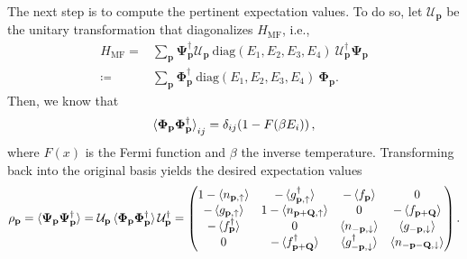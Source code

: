 \documentclass{article}
\begin{document}
The next step is to compute the pertinent expectation values.
To do so, let $\mathcal{U}_{\mathbf{p}}$ be the unitary transformation that diagonalizes $H_\mathrm{MF}$, i.e.,
\begin{align}
  H_\mathrm{MF} = &\sum_{\mathbf{p}} \mathbf{\Psi}_{\mathbf{p}}^\dagger \mathcal{U}_{\mathbf{p}} \ \mathrm{diag}(E_1, E_2, E_3, E_4)\ \mathcal{U}_{\mathbf{p}}^\dagger \mathbf{\Psi}_{\mathbf{p}} \\
    \coloneqq &\sum_{\mathbf{p}} \mathbf{\Phi}_{\mathbf{p}}^\dagger \ \mathrm{diag}(E_1, E_2, E_3, E_4)\ \mathbf{\Phi}_{\mathbf{p}}.
\end{align}
Then, we know that
\begin{equation}
    \braket{\mathbf{\Phi}_{\mathbf{p}} \mathbf{\Phi}_{\mathbf{p}}^\dagger}_{ij} = \delta_{ij} (1 - F(\beta E_i))\,,
\end{equation}
where $F(x)$ is the Fermi function and $\beta$ the inverse temperature.
Transforming back into the original basis yields the desired expectation values
\begin{equation}
  \rho_{\mathbf{p}} = \braket{\mathbf{\Psi}_{\mathbf{p}} \mathbf{\Psi}_{\mathbf{p}}^\dagger} = \mathcal{U}_{\mathbf{p}} \braket{\mathbf{\Phi}_{\mathbf{p}} \mathbf{\Phi}_{\mathbf{p}}^\dagger} \mathcal{U}_{\mathbf{p}}^\dagger 
  = \begin{pmatrix}
        1 - \braket{n_{\mathbf{p},\uparrow}} & -\braket{g_{\mathbf{p},\uparrow}^\dagger} & -\braket{f_{\mathbf{p}}} & 0 \\
        -\braket{g_{\mathbf{p},\uparrow}} & 1 - \braket{n_{\mathbf{p}+\mathbf{Q},\uparrow}} & 0 & -\braket{f_{\mathbf{p}+\mathbf{Q}}} \\
        -\braket{f_{\mathbf{p}}^\dagger} & 0 & \braket{n_{-\mathbf{p},\downarrow}} & \braket{g_{-\mathbf{p},\downarrow}} \\
        0 & -\braket{f_{\mathbf{p}+\mathbf{Q}}^\dagger} & \braket{g_{-\mathbf{p},\downarrow}^\dagger} & \braket{n_{-\mathbf{p}-\mathbf{Q},\downarrow}}
    \end{pmatrix}.
\end{equation}
\end{document}
